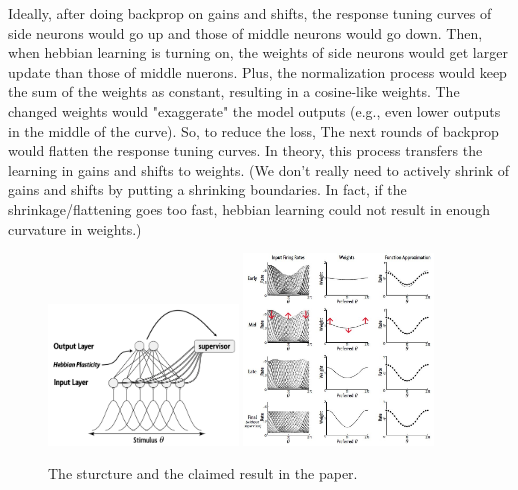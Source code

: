 \documentclass[12pt, a4paper]{article}
\begin{document}

Ideally, after doing backprop on gains and shifts, the response tuning curves of side neurons would go up and those of middle neurons would go down. Then, when hebbian learning is turning on, the weights of side neurons would get larger update than those of middle nuerons. Plus, the normalization process would keep the sum of the weights as constant, resulting in a cosine-like weights. The changed weights would "exaggerate" the model outputs (e.g., even lower outputs in the middle of the curve). So, to reduce the loss, The next rounds of backprop would flatten the response tuning curves. In theory, this process transfers the learning in gains and shifts to weights. (We don't really need to actively shrink of gains and shifts by putting a shrinking boundaries. In fact, if the shrinkage/flattening goes too fast, hebbian learning could not result in enough curvature in weights.)

\begin{figure}[H]
    \centering
    \includegraphics[width=0.45\textwidth]{FNN/fig/abb05_struc.png}
    \includegraphics[width=0.45\textwidth]{FNN/fig/abb05_paperresult_draw.jpg}
    \\
    \caption{The sturcture and the claimed result in the paper.}
\end{figure}
\end{document}
